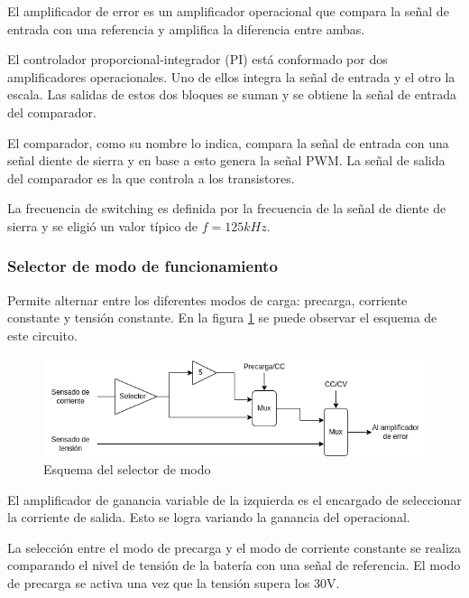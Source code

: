 El amplificador de error es un amplificador operacional que compara la señal de entrada con una referencia y
amplifica la diferencia entre ambas.

El controlador proporcional-integrador (PI) está conformado por dos amplificadores operacionales. Uno de ellos integra la señal de entrada y el otro la escala.
Las salidas de estos dos bloques se suman y se obtiene la señal de entrada del comparador.

El comparador, como su nombre lo indica, compara la señal de entrada con una señal diente de sierra y en base a esto genera la señal PWM.
La señal de salida del comparador es la que controla a los transistores. 

La frecuencia de switching es definida por la frecuencia de la señal de diente de sierra y se eligió un valor típico de $f=125kHz$.

\subsubsection{Selector de modo de funcionamiento}

Permite alternar entre los diferentes modos de carga: precarga, corriente constante y tensión constante. 
En la figura \ref{fig:esquema_selector} se puede observar el esquema de este circuito.

\begin{figure}[H]
    \centering
    \includegraphics[width=\textwidth]{images/selector.png}
    \caption{Esquema del selector de modo}
    \label{fig:esquema_selector}
\end{figure}

El amplificador de ganancia variable de la izquierda es el encargado de seleccionar la corriente de salida.
Esto se logra variando la ganancia del operacional.

La selección entre el modo de precarga y el modo de corriente constante se realiza comparando el nivel de tensión de la batería con una señal de referencia.
El modo de precarga se activa una vez que la tensión supera los 30V.

